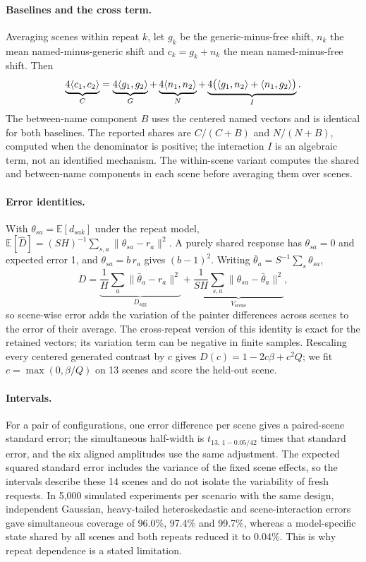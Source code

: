 \paragraph{Baselines and the cross term.} Averaging scenes within repeat $k$, let
$g_k$ be the generic-minus-free shift, $n_k$ the mean named-minus-generic shift and
$c_k=g_k+n_k$ the mean named-minus-free shift. Then
\begin{equation}
\underbrace{4\langle c_1,c_2\rangle}_{C}=\underbrace{4\langle g_1,g_2\rangle}_{G}
+\underbrace{4\langle n_1,n_2\rangle}_{N}
+\underbrace{4\bigl(\langle g_1,n_2\rangle+\langle n_1,g_2\rangle\bigr)}_{I}.
\end{equation}
The between-name component $B$ uses the centered named vectors and is identical for
both baselines. The reported shares are $C/(C+B)$ and $N/(N+B)$, computed when the
denominator is positive; the interaction $I$ is an algebraic term, not an identified
mechanism. The within-scene variant computes the shared and between-name components
in each scene before averaging them over scenes.

\paragraph{Error identities.} With $\theta_{sa}=\mathbb E[d_{sak}]$ under the repeat
model, $\mathbb E[\widehat D]=(SH)^{-1}\sum_{s,a}\|\theta_{sa}-r_a\|^2$. A purely shared
response has $\theta_{sa}=0$ and expected error 1, and $\theta_{sa}=b\,r_a$ gives
$(b-1)^2$. Writing $\bar\theta_a=S^{-1}\sum_s\theta_{sa}$,
\begin{equation}
D=\underbrace{\frac1H\sum_a\|\bar\theta_a-r_a\|^2}_{D_{\mathrm{agg}}}
+\underbrace{\frac{1}{SH}\sum_{s,a}\|\theta_{sa}-\bar\theta_a\|^2}_{V_{\mathrm{scene}}},
\end{equation}
so scene-wise error adds the variation of the painter differences across scenes to
the error of their average. The cross-repeat version of this identity is exact for the
retained vectors; its variation term can be negative in finite samples. Rescaling
every centered generated contrast by $c$ gives $D(c)=1-2c\beta+c^2Q$; we fit
$c=\max(0,\beta/Q)$ on 13 scenes and score the held-out scene.

\paragraph{Intervals.} For a pair of configurations, one error difference per scene
gives a paired-scene standard error; the simultaneous half-width is
$t_{13,\,1-0.05/42}$ times that standard error, and the six aligned amplitudes use
the same adjustment. The expected squared standard error includes the variance of the
fixed scene effects, so the intervals describe these 14 scenes and do not isolate the
variability of fresh requests. In 5,000 simulated experiments per scenario with the
same design, independent Gaussian, heavy-tailed heteroskedastic and scene-interaction
errors gave simultaneous coverage of 96.0\%, 97.4\% and 99.7\%, whereas a
model-specific state shared by all scenes and both repeats reduced it to 0.04\%. This
is why repeat dependence is a stated limitation.

